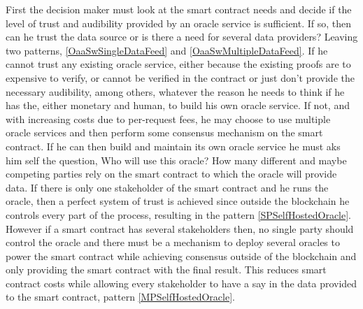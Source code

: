 First the decision maker must look at the smart contract needs and decide if the level of trust and audibility provided by an oracle service is sufficient. If so, then can he trust the data source or is there a need for several data providers? Leaving two patterns, \ref{OaaSwSingleDataFeed} and \ref{OaaSwMultipleDataFeed}.
If he cannot trust any existing oracle service, either because the existing proofs are to expensive to verify, or cannot be verified in the contract or just don't provide the necessary audibility, among others, whatever the reason he needs to think if he has the, either monetary and human, to build his own oracle service. If not, and with increasing costs due to per-request fees, he may choose to use multiple oracle services and then perform some consensus mechanism on the smart contract. If he can then build and maintain its own oracle service he must aks him self the question, Who will use this oracle? How many different and maybe competing parties rely on the smart contract to which the oracle will provide data. If there is only one stakeholder of the smart contract and he runs the oracle, then a perfect system of trust is achieved since outside the blockchain he controls every part of the process, resulting in the pattern \ref{SPSelfHostedOracle}. However if a smart contract has several stakeholders then, no single party should control the oracle and there must be a mechanism to deploy several oracles to power the smart contract while achieving consensus outside of the blockchain and only providing the smart contract with the final result. This reduces smart contract costs while allowing every stakeholder to have a say in the data provided to the smart contract, pattern \ref{MPSelfHostedOracle}.

